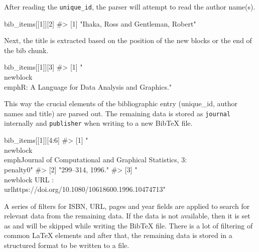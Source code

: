 After reading the \verb|unique_id|, the parser will attempt to read the author name(s).

\begin{Sinput}
bib_items[[1]][2]
#> [1] "Ihaka, Ross and Gentleman, Robert"
\end{Sinput}

Next, the title is extracted based on the position of the new blocks or the end of the bib chunk. 

\begin{Sinput}
bib_items[[1]][3]
#> [1] "\\newblock \\emph{R: A Language for Data Analysis and Graphics.}"
\end{Sinput}

This way the crucial elements of the bibliographic entry (unique\_id, author names and title) are parsed out.
The remaining data is stored as \verb|journal| internally and \verb|publisher| when writing to a new BibTeX file.

\begin{Sinput}
bib_items[[1]][4:6]
#> [1] "\\newblock \\emph{Journal of Computational and Graphical Statistics}, 3:\\penalty0"
#> [2] "299--314, 1996."                                                                   
#> [3] "\\newblock URL : \\url{https://doi.org/10.1080/10618600.1996.10474713}"
\end{Sinput}


A series of filters for ISBN, URL, pages and year fields are applied to search for relevant data from the remaining data. If the data is not available, then it is set as  and will be skipped while writing the BibTeX file. 
There is a lot of filtering of common LaTeX elements and after that, the remaining data is stored in a structured format to be written to a file. 


\begin{Schunk}
\end{Schunk}


